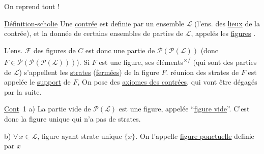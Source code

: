 On reprend tout !

\uline{Définition-scholie} Une \uline{contrée}  est definie par un ensemble $\mathcal{L}$ (l'ens. des \uline{lieux} de la contrée), et la donnée de certains ensembles de parties de $\mathcal{L}$, appelés les \uline{figures} .

L'ens. $\mathcal{F}$ des figures de $C$ est donc une  partie de $\mathcal{P}(\mathcal{P}(\mathcal{L}))$ (donc $F\in \mathcal{P}(\mathcal{P}(\mathcal{P}(\mathcal{L})))$). Si $F$ est une figure, ses éléments\textsuperscript{$\times$/} (qui sont des parties de $\mathcal{L}$) s'appellent les \uline{strates} (\uline{fermées}) de la figure $F$.  réunion des strates  de $F$ est appelée le \uline{support} de $F$,  On pose des \uline{axiomes des contrées}, qui vont être dégagés par la suite.

\uline{Cont}~1 \quad a) La partie vide de $\mathcal{P}(\mathcal{L})$ est une  figure, appelée ``\uline{figure vide}''. C'est donc la figure unique qui n'a pas de strates.

\margin{$\big\Vert$}
b) $\forall\,x\in \mathcal{L}$,  figure ayant  strate unique $\{x\}$. On l'appelle \uline{figure ponctuelle} definie par $x$
